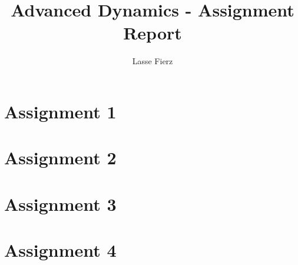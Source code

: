 \documentclass{article}
\title{Advanced Dynamics - Assignment Report}
\author{Lasse Fierz}
\begin{document}
    \maketitle

    \clearpage
    \tableofcontents
    \clearpage
    \section{Assignment 1}
    
    \clearpage
    \section{Assignment 2}
    
    \clearpage
    \section{Assignment 3}
    
    \clearpage
    \section{Assignment 4}
    
\end{document}
